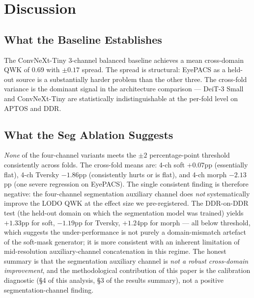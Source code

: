 \documentclass[11pt]{article}
\begin{document}
\section{Discussion}

\subsection{What the Baseline Establishes}
The ConvNeXt-Tiny 3-channel balanced baseline achieves a mean cross-domain QWK of 0.69 with $\pm 0.17$ spread. The spread is structural: EyePACS as a held-out source is a substantially harder problem than the other three. The cross-fold variance is the dominant signal in the architecture comparison --- DeiT-3 Small and ConvNeXt-Tiny are statistically indistinguishable at the per-fold level on APTOS and DDR.

\subsection{What the Seg Ablation Suggests}
\emph{None} of the four-channel variants meets the $\pm 2$ percentage-point threshold consistently across folds. The cross-fold means are: 4-ch soft $+0.07$pp (essentially flat), 4-ch Tversky $-1.86$pp (consistently hurts or is flat), and 4-ch morph $-2.13$pp (one severe regression on EyePACS). The single consistent finding is therefore negative: the four-channel segmentation auxiliary channel does \emph{not} systematically improve the LODO QWK at the effect size we pre-registered. The DDR-on-DDR test (the held-out domain on which the segmentation model was trained) yields $+1.33$pp for soft, $-1.19$pp for Tversky, $+1.24$pp for morph --- all below threshold, which suggests the under-performance is not purely a domain-mismatch artefact of the soft-mask generator; it is more consistent with an inherent limitation of mid-resolution auxiliary-channel concatenation in this regime. The honest summary is that the segmentation auxiliary channel is \emph{not a robust cross-domain improvement}, and the methodological contribution of this paper is the calibration diagnostic (§4 of this analysis, §3 of the results summary), not a positive segmentation-channel finding.
\end{document}
